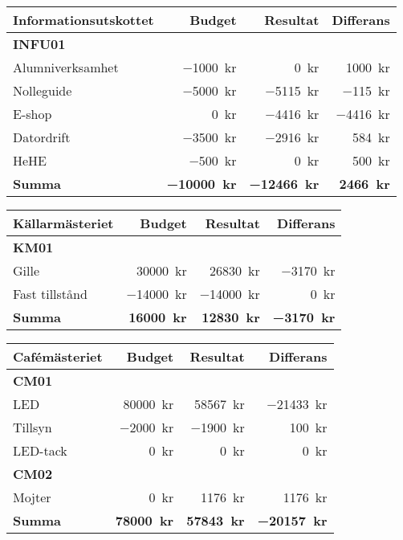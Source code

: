 \documentclass[../_main/handlingar.tex]{subfiles}
\begin{document}
\begin{tabularx}{12cm}{X r r r}
    \textbf{\large Informationsutskottet} & \textbf{Budget} & \textbf{Resultat} & \textbf{Differans} \\
    \hline
    \textbf{INFU01} \\
    Alumniverksamhet & \SI{-1000}{kr} & \SI{0}{kr} & \SI{1000}{kr} \\
    Nolleguide & \SI{-5000}{kr} & \SI{-5115}{kr} & \SI{-115}{kr} \\
    E-shop & \SI{0}{kr} & \SI{-4416}{kr}  & \SI{-4416}{kr}\\
    Datordrift & \SI{-3500}{kr} & \SI{-2916}{kr} & \SI{584}{kr} \\
    HeHE & \SI{-500}{kr} & \SI{0}{kr} & \SI{500}{kr}\\
    \hline
    \textbf{Summa} & \textbf{\SI{-10000}{kr}} & \textbf{\SI{-12466}{kr}} & \textbf{\SI{2466}{kr}}\\
\end{tabularx}

\begin{tabularx}{12cm}{X r r r}
    \textbf{\large Källarmästeriet} & \textbf{Budget} & \textbf{Resultat} & \textbf{Differans} \\
    \hline
    \textbf{KM01} \\
    Gille & \SI{30000}{kr} & \SI{26830}{kr} & \SI{-3170}{kr} \\
    Fast tillstånd & \SI{-14000}{kr} & \SI{-14000}{kr} & \SI{0}{kr} \\
    \hline
    \textbf{Summa} & \textbf{\SI{16000}{kr}} & \textbf{\SI{12830}{kr}} & \textbf{\SI{-3170}{kr}} \\
\end{tabularx}

\begin{tabularx}{12cm}{X r r r}
    \textbf{\large Cafémästeriet} & \textbf{Budget} & \textbf{Resultat} & \textbf{Differans} \\
    \hline
    \textbf{CM01} \\
    LED & \SI{80000}{kr} & \SI{58567}{kr} & \SI{-21433}{kr} \\
    Tillsyn & \SI{-2000}{kr} & \SI{-1900}{kr} & \SI{100}{kr} \\
    LED-tack & \SI{0}{kr} & \SI{0}{kr} & \SI{0}{kr} \\
    \textbf{CM02} \\
    Mojter & \SI{0}{kr} & \SI{1176}{kr} & \SI{1176}{kr}  \\
    \hline
    \textbf{Summa} & \textbf{\SI{78000}{kr}} & \textbf{\SI{57843}{kr}} & \textbf{\SI{-20157}{kr}} \\
\end{tabularx}
\end{document}
